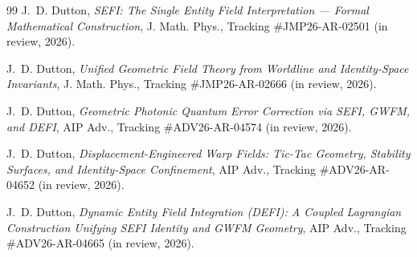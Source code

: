 \documentclass[11pt,a4paper]{article}
\begin{document}
\begin{thebibliography}{99}
J.~D. Dutton, \emph{SEFI: The Single Entity Field Interpretation — Formal Mathematical Construction}, J. Math. Phys., Tracking \#JMP26-AR-02501 (in review, 2026).

J.~D. Dutton, \emph{Unified Geometric Field Theory from Worldline and Identity-Space Invariants}, J. Math. Phys., Tracking \#JMP26-AR-02666 (in review, 2026).

J.~D. Dutton, \emph{Geometric Photonic Quantum Error Correction via SEFI, GWFM, and DEFI}, AIP Adv., Tracking \#ADV26-AR-04574 (in review, 2026).

J.~D. Dutton, \emph{Displacement-Engineered Warp Fields: Tic-Tac Geometry, Stability Surfaces, and Identity-Space Confinement}, AIP Adv., Tracking \#ADV26-AR-04652 (in review, 2026).

J.~D. Dutton, \emph{Dynamic Entity Field Integration (DEFI): A Coupled Lagrangian Construction Unifying SEFI Identity and GWFM Geometry}, AIP Adv., Tracking \#ADV26-AR-04665 (in review, 2026).

\end{thebibliography}
\end{document}
